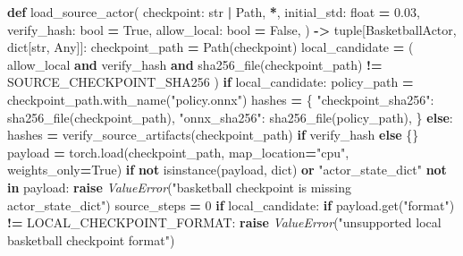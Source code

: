 \documentclass[
  chinese,
  11pt,
  letterpaper,
]{article}
\newenvironment{Shaded}{\begin{snugshade}}{\end{snugshade}}
\newcommand{\BuiltInTok}[1]{#1}
\newcommand{\ControlFlowTok}[1]{\textcolor[rgb]{0.13,0.29,0.53}{\textbf{#1}}}
\newcommand{\DecValTok}[1]{\textcolor[rgb]{0.00,0.00,0.81}{#1}}
\newcommand{\FloatTok}[1]{\textcolor[rgb]{0.00,0.00,0.81}{#1}}
\newcommand{\KeywordTok}[1]{\textcolor[rgb]{0.13,0.29,0.53}{\textbf{#1}}}
\newcommand{\NormalTok}[1]{#1}
\newcommand{\OperatorTok}[1]{\textcolor[rgb]{0.81,0.36,0.00}{\textbf{#1}}}
\newcommand{\PreprocessorTok}[1]{\textcolor[rgb]{0.56,0.35,0.01}{\textit{#1}}}
\newcommand{\StringTok}[1]{\textcolor[rgb]{0.31,0.60,0.02}{#1}}
\newcommand{\VariableTok}[1]{\textcolor[rgb]{0.00,0.00,0.00}{#1}}
\renewenvironment{Shaded}{\par\smallskip}{\par\smallskip}
\begin{document}
\begin{Shaded}
\begin{Highlighting}[]
\KeywordTok{def}\NormalTok{ load\_source\_actor(}
\NormalTok{    checkpoint: }\BuiltInTok{str} \OperatorTok{|}\NormalTok{ Path,}
    \OperatorTok{*}\NormalTok{,}
\NormalTok{    initial\_std: }\BuiltInTok{float} \OperatorTok{=} \FloatTok{0.03}\NormalTok{,}
\NormalTok{    verify\_hash: }\BuiltInTok{bool} \OperatorTok{=} \VariableTok{True}\NormalTok{,}
\NormalTok{    allow\_local: }\BuiltInTok{bool} \OperatorTok{=} \VariableTok{False}\NormalTok{,}
\NormalTok{) }\OperatorTok{{-}\textgreater{}} \BuiltInTok{tuple}\NormalTok{[BasketballActor, }\BuiltInTok{dict}\NormalTok{[}\BuiltInTok{str}\NormalTok{, Any]]:}
\NormalTok{    checkpoint\_path }\OperatorTok{=}\NormalTok{ Path(checkpoint)}
\NormalTok{    local\_candidate }\OperatorTok{=}\NormalTok{ (}
\NormalTok{        allow\_local }\KeywordTok{and}\NormalTok{ verify\_hash}
        \KeywordTok{and}\NormalTok{ sha256\_file(checkpoint\_path) }\OperatorTok{!=}\NormalTok{ SOURCE\_CHECKPOINT\_SHA256}
\NormalTok{    )}
    \ControlFlowTok{if}\NormalTok{ local\_candidate:}
\NormalTok{        policy\_path }\OperatorTok{=}\NormalTok{ checkpoint\_path.with\_name(}\StringTok{"policy.onnx"}\NormalTok{)}
\NormalTok{        hashes }\OperatorTok{=}\NormalTok{ \{}
            \StringTok{"checkpoint\_sha256"}\NormalTok{: sha256\_file(checkpoint\_path),}
            \StringTok{"onnx\_sha256"}\NormalTok{: sha256\_file(policy\_path),}
\NormalTok{        \}}
    \ControlFlowTok{else}\NormalTok{:}
\NormalTok{        hashes }\OperatorTok{=}\NormalTok{ verify\_source\_artifacts(checkpoint\_path) }\ControlFlowTok{if}\NormalTok{ verify\_hash }\ControlFlowTok{else}\NormalTok{ \{\}}
\NormalTok{    payload }\OperatorTok{=}\NormalTok{ torch.load(checkpoint\_path, map\_location}\OperatorTok{=}\StringTok{"cpu"}\NormalTok{, weights\_only}\OperatorTok{=}\VariableTok{True}\NormalTok{)}
    \ControlFlowTok{if} \KeywordTok{not} \BuiltInTok{isinstance}\NormalTok{(payload, }\BuiltInTok{dict}\NormalTok{) }\KeywordTok{or} \StringTok{"actor\_state\_dict"} \KeywordTok{not} \KeywordTok{in}\NormalTok{ payload:}
        \ControlFlowTok{raise} \PreprocessorTok{ValueError}\NormalTok{(}\StringTok{"basketball checkpoint is missing actor\_state\_dict"}\NormalTok{)}
\NormalTok{    source\_steps }\OperatorTok{=} \DecValTok{0}
    \ControlFlowTok{if}\NormalTok{ local\_candidate:}
        \ControlFlowTok{if}\NormalTok{ payload.get(}\StringTok{"format"}\NormalTok{) }\OperatorTok{!=}\NormalTok{ LOCAL\_CHECKPOINT\_FORMAT:}
            \ControlFlowTok{raise} \PreprocessorTok{ValueError}\NormalTok{(}\StringTok{"unsupported local basketball checkpoint format"}\NormalTok{)}

\end{Highlighting}
\end{Shaded}
\end{document}
